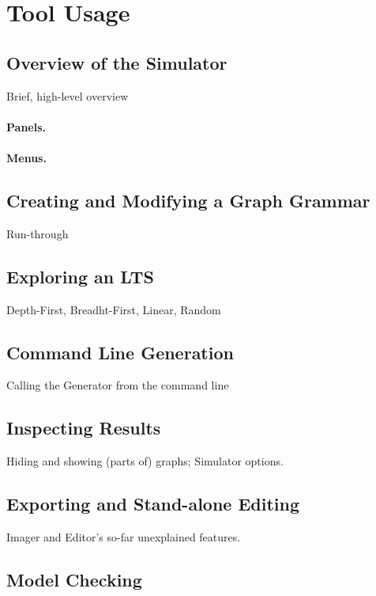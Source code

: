 \section{Tool Usage}

\subsection{Overview of the Simulator}

Brief, high-level overview

\paragraph{Panels.}

\paragraph{Menus.}

\subsection{Creating and Modifying a Graph Grammar}

Run-through

\subsection{Exploring an LTS}

Depth-First, Breadht-First, Linear, Random

\subsection{Command Line Generation}

Calling the Generator from the command line

\subsection{Inspecting Results}

Hiding and showing (parts of) graphs; Simulator options.

\subsection{Exporting and Stand-alone Editing}

Imager and Editor's so-far unexplained features.

\subsection{Model Checking}

